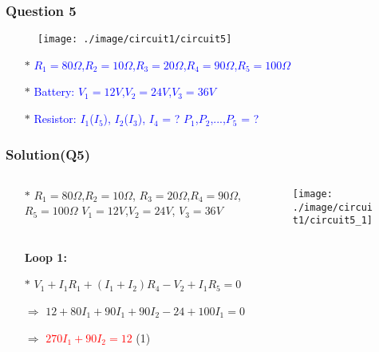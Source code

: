 \documentclass{beamer}
\newcommand{\blue}[1]{\textcolor{blue}{#1}}
\newcommand{\red}[1]{\textcolor{red}{#1}}
\begin{document}
\begin{frame}
\frametitle{Question 5}


\begin{figure}[H]
  \centering
  \texttt{[image: ./image/circuit1/circuit5]}
\end{figure}


\begin{itemize} \itemsep1pt \parskip0pt 
  \item[$\ast$] \blue{$R_1 = 80\Omega$,$R_2 = 10\Omega$,$R_3 = 20\Omega$,$R_4 = 90\Omega$,$R_5 = 100\Omega$}
  \item[$\ast$] \blue{Battery: $V_1 = 12V$,$V_2 = 24V$,$V_3 = 36V$}
  \item[$\ast$] \blue{Resistor: $I_1$($I_5$), $I_2$($I_3$), $I_4$ = ? \hspace{8mm} $P_1$,$P_2$,...,$P_5$ = ?}
\end{itemize}


\end{frame}


\begin{frame}
\frametitle{Solution(Q5)}
\begin{columns}
\begin{column}{5cm}
\begin{itemize} \itemsep1pt \parskip0pt 
  \item[$\ast$]  $R_1 = 80\Omega$,$R_2 = 10\Omega$,\newline
  $R_3 = 20\Omega$,$R_4 = 90\Omega$,\newline
  $R_5 = 100\Omega$ \newline
  $V_1 = 12V$,$V_2 = 24V$,\newline
  $V_3 = 36V$
\end{itemize}
\end{column}



\begin{column}{8cm}
\begin{figure}[H]
  \centering
  \texttt{[image: ./image/circuit1/circuit5\_1]}
\end{figure}
\end{column}
\end{columns}

\begin{itemize} \itemsep1pt \parskip0pt 
  \item[] {\bf Loop 1:}
  \item[$\ast$] $V_1 + I_1R_1 + (I_1+I_2)R_4 - V_2 + I_1R_5 = 0$
  \item[$\Rightarrow$] $12 + 80I_1 + 90I_1 + 90I_2 - 24 + 100I_1 = 0$
  \item[$\Rightarrow$] \red{$270I_1 + 90I_2 = 12$} \hspace{8 mm}(1)
\end{itemize}

\end{frame}
\end{document}
